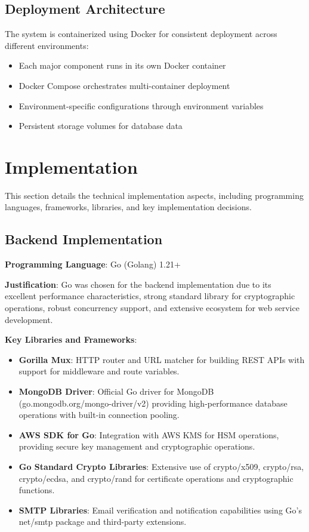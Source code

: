 \subsection{Deployment Architecture}

The system is containerized using Docker for consistent deployment across different environments:

\begin{itemize}
    \item Each major component runs in its own Docker container
    \item Docker Compose orchestrates multi-container deployment
    \item Environment-specific configurations through environment variables
    \item Persistent storage volumes for database data
\end{itemize}

\section{Implementation}

This section details the technical implementation aspects, including programming languages, frameworks, libraries, and key implementation decisions.

\subsection{Backend Implementation}

\textbf{Programming Language}: Go (Golang) 1.21+

\textbf{Justification}: Go was chosen for the backend implementation due to its excellent performance characteristics, strong standard library for cryptographic operations, robust concurrency support, and extensive ecosystem for web service development.

\textbf{Key Libraries and Frameworks}:

\begin{itemize}
    \item \textbf{Gorilla Mux}: HTTP router and URL matcher for building REST APIs with support for middleware and route variables.
    
    \item \textbf{MongoDB Driver}: Official Go driver for MongoDB (go.mongodb.org/mongo-driver/v2) providing high-performance database operations with built-in connection pooling.
    
    \item \textbf{AWS SDK for Go}: Integration with AWS KMS for HSM operations, providing secure key management and cryptographic operations.
    
    \item \textbf{Go Standard Crypto Libraries}: Extensive use of crypto/x509, crypto/rsa, crypto/ecdsa, and crypto/rand for certificate operations and cryptographic functions.
    
    \item \textbf{SMTP Libraries}: Email verification and notification capabilities using Go's net/smtp package and third-party extensions.
\end{itemize}

